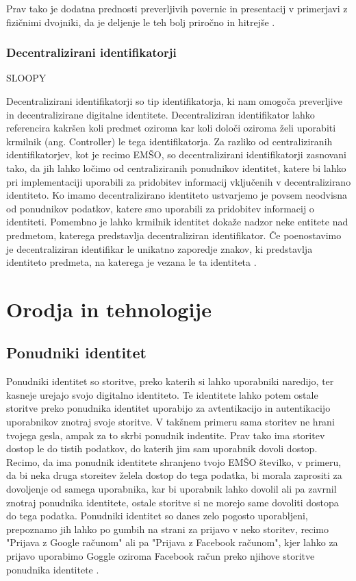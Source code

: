 \documentclass[a4paper,12pt,openright]{book}
\begin{document}
Prav tako je dodatna prednosti preverljivih povernic in presentacij v primerjavi z fizičnimi dvojniki, da je deljenje le teh bolj priročno in hitrejše \cite{verifiable_credentials}.

\subsection{Decentralizirani identifikatorji}
SLOOPY

Decentralizirani identifikatorji so tip identifikatorja, ki nam omogoča preverljive in decentralizirane digitalne identitete.
Decentraliziran identifikator lahko referencira kakršen koli predmet oziroma kar koli določi oziroma želi 
uporabiti krmilnik (ang. Controller) le tega identifikatorja.
Za razliko od centraliziranih identifikatorjev, kot je recimo EMŠO, so decentralizirani identifikatorji zasnovani tako, da jih
lahko ločimo od centraliziranih ponudnikov identitet, katere bi lahko pri implementaciji uporabili za pridobitev informacij vključenih v decentralizirano identiteto.
Ko imamo decentralizirano identiteto ustvarjemo je povsem neodvisna od ponudnikov podatkov, katere smo uporabili za pridobitev informacij o identiteti.
Pomembno je lahko krmilnik identitet dokaže nadzor neke entitete nad predmetom, katerega predstavlja decentraliziran identifikator.
Če poenostavimo je decentraliziran identifikar le unikatno zaporedje znakov, ki predstavlja identiteto predmeta, 
na katerega je vezana le ta identiteta \cite{decentralized_identifiers}.




\chapter{Orodja in tehnologije}

\section{Ponudniki identitet}
Ponudniki identitet so storitve, preko katerih si lahko uporabniki naredijo, ter kasneje urejajo svojo digitalno identiteto.
Te identitete lahko potem ostale storitve preko ponudnika identitet uporabijo za avtentikacijo in autentikacijo uporabnikov znotraj svoje storitve.
V takšnem primeru sama storitev ne hrani tvojega gesla, ampak za to skrbi ponudnik indentite.
Prav tako ima storitev dostop le do tistih podatkov, do katerih jim sam uporabnik dovoli dostop.
Recimo, da ima ponudnik identitete shranjeno tvojo EMŠO številko, v primeru, da bi neka druga storeitev želela dostop do tega podatka,
bi morala zaprositi za dovoljenje od samega uporabnika, kar bi uporabnik lahko dovolil ali pa zavrnil znotraj ponudnika identitete,
ostale storitve si ne morejo same dovoliti dostopa do tega podatka.
Ponudniki identitet so danes zelo pogosto uporabljeni, prepoznamo jih lahko po gumbih na strani za prijavo v neko storitev, 
recimo "Prijava z Google računom" ali pa "Prijava z Facebook računom", kjer lahko za prijavo uporabimo Goggle oziroma 
Facebook račun preko njihove storitve ponudnika identitete \cite{identity_provider_ubisecure}.
\end{document}
